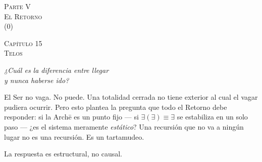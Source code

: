 \documentclass[10pt, openany, oneside]{book}
\renewcommand{\normalsize}{\fontsize{10}{13}\selectfont}
\renewcommand{\large}{\fontsize{11.5}{14}\selectfont}
\renewcommand{\LARGE}{\fontsize{15}{18}\selectfont}
\renewcommand{\huge}{\fontsize{17}{21}\selectfont}
\begin{document}
\newpage
\thispagestyle{empty}
\vspace*{\fill}
\begin{center}
    {\LARGE\scshape Parte V}\\[1em]
    {\large\scshape El Retorno}\\[0.5em]
    {\normalsize ($0$)}
\end{center}
\vspace*{\fill}
\newpage

%
%
%
%

\newpage

\begin{center}
    {\huge\scshape Capítulo 15}\\[0.3em]
    {\large\scshape Telos}
\end{center}

\vspace{1.5em}

\begin{center}
    \itshape
    ¿Cuál es la diferencia entre llegar\\
    y nunca haberse ido?
\end{center}

\vspace{2em}


\noindent El Ser no vaga. No puede. Una totalidad cerrada no tiene exterior al cual el vagar pudiera ocurrir. Pero esto plantea la pregunta que todo el Retorno debe responder: si la Arch\={e} es un punto fijo --- si $\exists(\exists) \equiv \exists$ se estabiliza en un solo paso --- ¿es el sistema meramente \textit{estático}? Una recursión que no va a ningún lugar no es una recursión. Es un tartamudeo.

La respuesta es estructural, no causal.

\vspace{1.5em}
\end{document}
